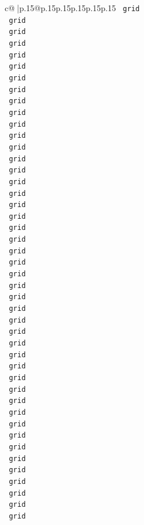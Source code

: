\documentclass{article}
\begin{document}
{\begin{supertabular}{c@{$\;$}|p{.15\linewidth}@{}p{.15\linewidth}p{.15\linewidth}p{.15\linewidth}p{.15\linewidth}p{.15\linewidth}}
{{{\texttt{ grid} \\
\texttt{ grid} \\
\texttt{ grid} \\
\texttt{ grid} \\
\texttt{ grid} \\
\texttt{ grid} \\
\texttt{ grid} \\
\texttt{ grid} \\
\texttt{ grid} \\
\texttt{ grid} \\
\texttt{ grid} \\
\texttt{ grid} \\
\texttt{ grid} \\
\texttt{ grid} \\
\texttt{ grid} \\
\texttt{ grid} \\
\texttt{ grid} \\
\texttt{ grid} \\
\texttt{ grid} \\
\texttt{ grid} \\
\texttt{ grid} \\
\texttt{ grid} \\
\texttt{ grid} \\
\texttt{ grid} \\
\texttt{ grid} \\
\texttt{ grid} \\
\texttt{ grid} \\
\texttt{ grid} \\
\texttt{ grid} \\
\texttt{ grid} \\
\texttt{ grid} \\
\texttt{ grid} \\
\texttt{ grid} \\
\texttt{ grid} \\
\texttt{ grid} \\
\texttt{ grid} \\
\texttt{ grid} \\
\texttt{ grid} \\
\texttt{ grid} \\
\texttt{ grid} \\
\texttt{ grid} \\
\texttt{ grid} \\
\texttt{ grid} \\
\texttt{ grid} \\
\texttt{ grid} \\
}}}
\end{supertabular}}
\end{document}
